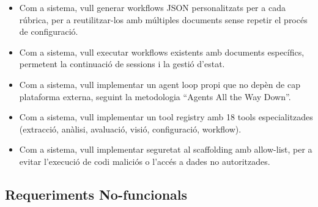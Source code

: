 \documentclass[12pt,a4paper,twoside]{report}
\begin{document}
\begin{itemize}
    \item Com a sistema, vull generar workflows JSON personalitzats per a cada r\'ubrica, per a reutilitzar-los amb m\'ultiples documents sense repetir el proc\'es de configuraci\'o.
    \item Com a sistema, vull executar workflows existents amb documents espec\'ifics, permetent la continuaci\'o de sessions i la gesti\'o d'estat.
    \item Com a sistema, vull implementar un agent loop propi que no dep\`en de cap plataforma externa, seguint la metodologia ``Agents All the Way Down''.
    \item Com a sistema, vull implementar un tool registry amb 18 tools especialitzades (extracci\'o, an\`alisi, avaluaci\'o, visi\'o, configuraci\'o, workflow).
    \item Com a sistema, vull implementar seguretat al scaffolding amb allow-list, per a evitar l'execuci\'o de codi malici\'os o l'acc\'es a dades no autoritzades.
\end{itemize}

\subsection{Requeriments No-funcionals}
\label{subsec:req-no-funcionals}
\end{document}
